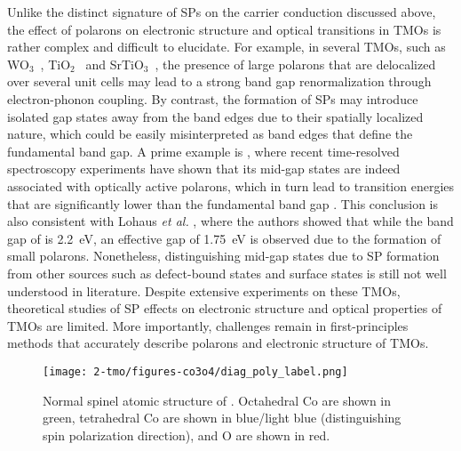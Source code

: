 Unlike the distinct signature of SPs on the carrier conduction discussed above, the effect of polarons on electronic structure and optical transitions in TMOs is rather complex and difficult to elucidate. For example, in several TMOs, such as WO$_3$~\cite{gerosa2018role,Ping2013}, TiO$_2$~\cite{TiO22018,Moser2013,Kang2010} and SrTiO$_3$~\cite{verdi2017origin,Wang2016}, the presence of large polarons that are delocalized over several unit cells may lead to a strong band gap renormalization through electron-phonon coupling. By contrast, the formation of SPs may introduce isolated gap states away from the band edges due to their spatially localized nature, which could be easily misinterpreted as band edges that define the fundamental band gap. A prime example is , where recent time-resolved spectroscopy experiments have shown that its mid-gap states are indeed associated with optically active polarons, which in turn lead to transition energies that are significantly lower than the fundamental band gap \cite{carneiro2017excitation,biswas2018ultrafast}. This conclusion is also consistent with Lohaus \textit{et al.} \cite{lohaus2018limitation}, where the authors showed that while the band gap of  is 2.2~eV, an effective gap of 1.75~eV is observed due to the formation of small polarons. Nonetheless, distinguishing mid-gap states due to SP formation from other sources such as defect-bound states \cite{huda2010electronic,neufeld2015platinum,sanson2015polaronic} and surface states \cite{yatom2015toward} is still not well understood in literature. Despite extensive experiments on these TMOs, theoretical studies of SP effects on electronic structure and optical properties of TMOs are limited. More importantly, challenges remain in first-principles methods that accurately describe polarons and electronic structure of TMOs.

\begin{figure}[t]
\begin{center}
\texttt{[image: 2-tmo/figures-co3o4/diag\_poly\_label.png]}
\caption{Normal spinel atomic structure of \co. Octahedral Co are shown in green, tetrahedral Co are shown in blue/light blue (distinguishing spin polarization direction), and O are shown in red.}  \label{co3o4:fig:struct}
\end{center}
\end{figure}

